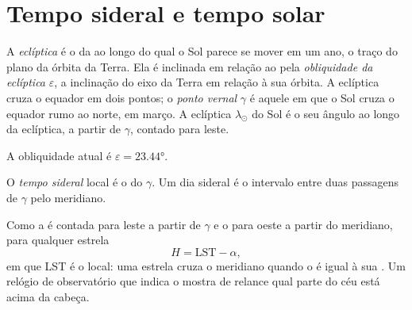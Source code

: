 \section{Tempo sideral e tempo solar}

\begin{definition}[A eclíptica]\label{def:b1:spherical-astronomy:ecliptic}
A \emph{eclíptica} é o  da  ao longo do qual o Sol parece se mover em um ano, o traço do plano da órbita da Terra. Ela é inclinada em relação ao  pela \emph{obliquidade da eclíptica} $\varepsilon$, a inclinação do eixo da Terra em relação à sua órbita. A eclíptica cruza o equador em dois pontos; o \emph{ponto vernal} $\gamma$ é aquele em que o Sol cruza o equador rumo ao norte, em março. A  eclíptica $\lambda_\odot$ do Sol é o seu ângulo ao longo da eclíptica, a partir de $\gamma$, contado para leste.
\end{definition}

A obliquidade atual é $\varepsilon = \ang{23.44}$.

\begin{definition}\label{def:b1:spherical-astronomy:sidereal-time}
O \emph{tempo sideral} local é o  do  $\gamma$. Um dia sideral é o intervalo entre duas passagens de $\gamma$ pelo meridiano.
\end{definition}

Como a  é contada para leste a partir de $\gamma$ e o  para oeste a partir do meridiano, para qualquer estrela
\[
  H = \mathrm{LST} - \alpha ,
\]
em que LST é o  local: uma estrela cruza o meridiano quando o  é igual à sua . Um relógio de observatório que indica o  mostra de relance qual parte do céu está acima da cabeça.

